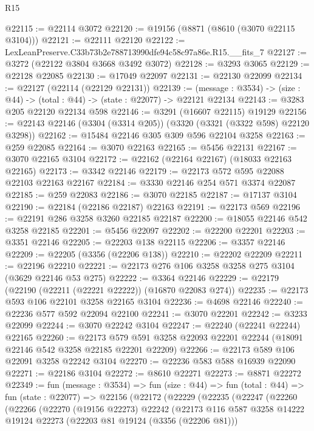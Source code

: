 \begin{lexlean}{R15}
\begin{coremodule}
@22115 := @22114 @3072
@22120 := @19156 (@8871 (@8610 (@3070 @22115 @3104)))
@22121 := @22111 @22120
@22122 := LexLeanPreserve.C33b73b2e788713990dfe94c58c97a86e.R15.__fits_7
@22127 := @3272 (@22122 @3804 @3668 @3492 @3072)
@22128 := @3293 @3065
@22129 := @22128 @22085
@22130 := @17049 @22097
@22131 := @22130 @22099
@22134 := @22127 (@22114 (@22129 @22131))
@22139 := (message : @3534) -> (size : @44) -> (total : @44) -> (state : @22077) -> @22121 @22134
@22143 := @3283 @205 @22120 @22134 @598
@22146 := @3291 (@16607 @22115) @19129
@22156 := @22143 @22146 (@3304 (@3314 @205)) (@3320 (@3321 (@3322 @598) @22120 @3298))
@22162 := @15484 @22146 @305 @309 @596 @22104 @3258
@22163 := @259 @22085
@22164 := @3070 @22163
@22165 := @5456 @22131
@22167 := @3070 @22165 @3104
@22172 := @22162 (@22164 @22167) (@18033 @22163 @22165)
@22173 := @3342 @22146
@22179 := @22173 @572 @595 @22088 @22103 @22163 @22167
@22184 := @3330 @22146 @254 @571 @3374 @22087
@22185 := @259 @22083
@22186 := @3070 @22185
@22187 := @17137 @3104
@22190 := @22184 (@22186 @22187) @22163
@22191 := @22173 @569
@22196 := @22191 @286 @3258 @3260 @22185 @22187
@22200 := @18055 @22146 @542 @3258 @22185
@22201 := @5456 @22097
@22202 := @22200 @22201
@22203 := @3351 @22146
@22205 := @22203 @138 @22115
@22206 := @3357 @22146
@22209 := @22205 (@3356 (@22206 @138))
@22210 := @22202 @22209
@22211 := @22196 @22210
@22221 := @22173 @276 @106 @3258 @3258 @275 @3104 (@3629 @22146 @53 @275)
@22222 := @3364 @22146
@22229 := @22179 (@22190 (@22211 (@22221 @22222)) (@16870 @22083 @274))
@22235 := @22173 @593 @106 @22101 @3258 @22165 @3104
@22236 := @4698 @22146
@22240 := @22236 @577 @592 @22094 @22100
@22241 := @3070 @22201
@22242 := @3233 @22099
@22244 := @3070 @22242 @3104
@22247 := @22240 (@22241 @22244) @22165
@22260 := @22173
    @579
    @591
    @3258
    @22093
    @22201
    @22244
    (@18091 @22146 @542 @3258 @22185 @22201 @22209)
@22266 := @22173 @589 @106 @22091 @3258 @22242 @3104
@22270 := @22236 @583 @588 @16939 @22090
@22271 := @22186 @3104
@22272 := @8610 @22271
@22273 := @8871 @22272
@22349 := fun (message : @3534) =>
  fun (size : @44) =>
  fun (total : @44) =>
  fun (state : @22077) =>
  @22156
    (@22172
      (@22229
        (@22235
          (@22247
            (@22260
              (@22266
                (@22270
                  (@19156 @22273)
                  @22242
                  (@22173
                    @116
                    @587
                    @3258
                    @14222
                    @19124
                    @22273
                    (@22203 @81 @19124 (@3356 (@22206 @81)))

\end{coremodule}
\end{lexlean}
